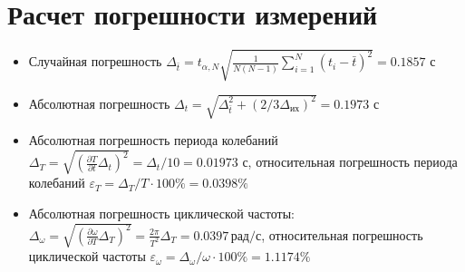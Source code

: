 \section{Расчет погрешности измерений}
\begin{itemize}
\item Случайная погрешность $\Delta_{\bar t} = t_{\alpha, N} \sqrt{\frac{1}{N(N-1)} \sum_{i=1}^N (t_i - \bar t)^2} = 0.1857$ с
\item Абсолютная погрешность $\Delta_t = \sqrt{\Delta_{\bar t}^2 + \left(2/3 \Delta_\text{их}\right)^2} = 0.1973$ с
\item Абсолютная погрешность периода колебаний $\Delta_T = \sqrt{\left(\frac{\partial T}{\partial t} \Delta_t\right)^2} = \Delta_t / 10 = 0.01973$ с,
относительная погрешность периода колебаний $\varepsilon_T = \Delta_T / T \cdot 100 \% = 0.0398 \% $
\item Абсолютная погрешность циклической частоты: $\Delta_\omega = \sqrt{\left( \frac{\partial \omega}{\partial T} \Delta_T \right)^2} = \frac{2 \pi}{T^2} \Delta_T = 0.0397 \, \text{рад}/\text{с}$,
относительная погрешность циклической частоты $\varepsilon_\omega = \Delta_\omega / \omega \cdot 100 \% = 1.1174 \%$
\end{itemize}

